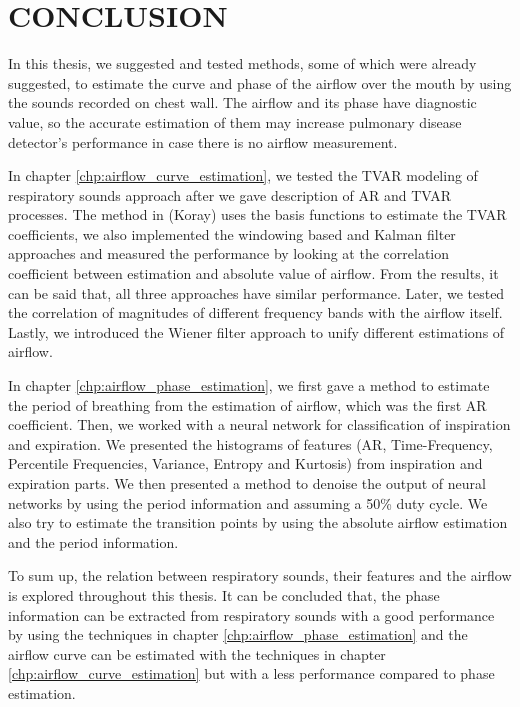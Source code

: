 \chapter{CONCLUSION}
\label{chp:conclusion}
In this thesis, we suggested and tested methods, some of which were already suggested, to estimate the curve and phase of the airflow over the mouth by using the sounds recorded on chest wall. The airflow and its phase have diagnostic value, so the accurate estimation of them may increase pulmonary disease detector's performance in case there is no airflow measurement.
\par In chapter \ref{chp:airflow_curve_estimation}, we tested the TVAR modeling of respiratory sounds approach after we gave description of AR and TVAR processes. The method in (Koray) uses the basis functions to estimate the TVAR coefficients, we also implemented the windowing based and Kalman filter approaches and measured the performance by looking at the correlation coefficient between estimation and absolute value of airflow. From the results, it can be said that, all three approaches have similar performance. Later, we tested the correlation of magnitudes of different frequency bands with the airflow itself. Lastly, we introduced the Wiener filter approach to unify different estimations of airflow.
\par In chapter \ref{chp:airflow_phase_estimation}, we first gave a method to estimate the period of breathing from the estimation of airflow, which was the first AR coefficient. Then, we worked with a neural network for classification of inspiration and expiration. We presented the histograms of features (AR, Time-Frequency, Percentile Frequencies, Variance, Entropy and Kurtosis) from inspiration and expiration parts. We then presented a method to denoise the output of neural networks by using the period information and assuming a 50\% duty cycle. We also try to estimate the transition points by using the absolute airflow estimation and the period information. 
\par To sum up, the relation between respiratory sounds, their features and the airflow is explored throughout this thesis. It can be concluded that, the phase information can be extracted from respiratory sounds with a good performance by using the techniques in chapter \ref{chp:airflow_phase_estimation} and the airflow curve can be estimated with the techniques in chapter \ref{chp:airflow_curve_estimation} but with a less performance compared to phase estimation.